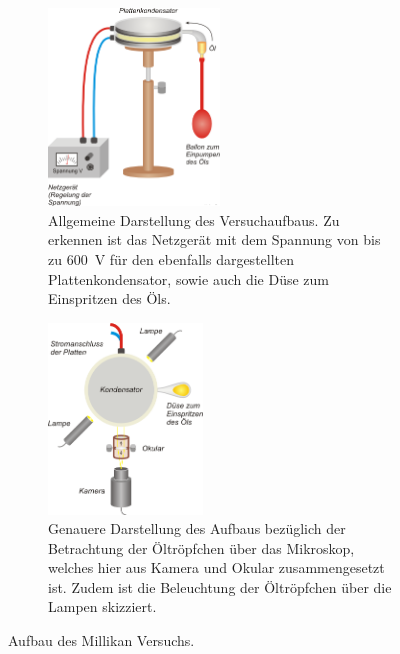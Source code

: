 \begin{figure}[ht]
	\centering
	\begin{subfigure}{\textwidth}
		\centering
		\includegraphics[width=0.5\textwidth]{auswertung/aufbau_1.png}
		\caption{Allgemeine Darstellung des Versuchaufbaus. Zu erkennen ist das Netzgerät mit dem Spannung von bis zu \SI{600}{\volt} für den ebenfalls dargestellten Plattenkondensator, sowie auch die Düse zum Einspritzen des Öls.\cite{Aufbau}}
		\label{fig:aufbau1}	
	\end{subfigure}
	\begin{subfigure}{\textwidth}
		\centering
		\includegraphics[width=0.45\textwidth]{auswertung/aufbau_2.png}
		\caption{Genauere Darstellung des Aufbaus bezüglich der Betrachtung der Öltröpfchen über das Mikroskop, welches hier aus Kamera und Okular zusammengesetzt ist. Zudem ist die Beleuchtung der Öltröpfchen über die Lampen skizziert.\cite{Aufbau}}
		\label{fig:aufbau2}	
	\end{subfigure}
	\caption{Aufbau des Millikan Versuchs.}
	\label{fig:aufbau}	
\end{figure}

